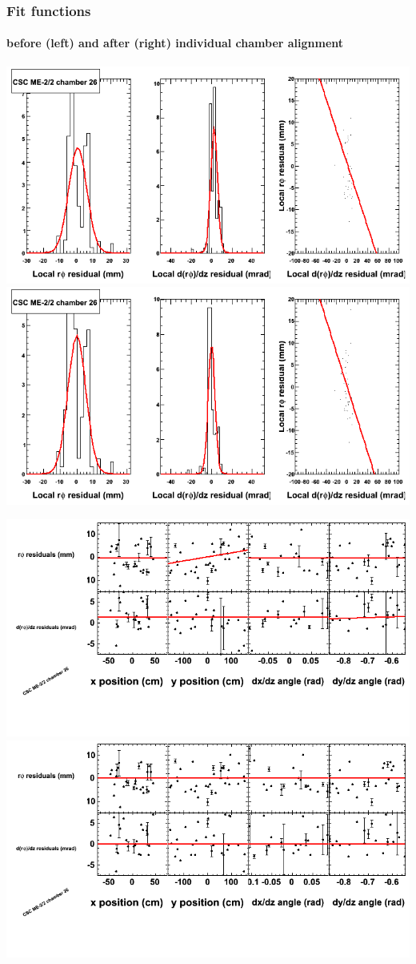 \documentclass[compress]{beamer}
\begin{document}
\begin{frame}
\frametitle{Fit functions}
\framesubtitle{before (left) and after (right) individual chamber alignment}
\includegraphics[width=0.5\linewidth]{ringfits_3dof/beforefit_MEm22_26_bellcurve.png} \includegraphics[width=0.5\linewidth]{ringfits_3dof/afterfit_MEm22_26_bellcurve.png}

\includegraphics[width=0.5\linewidth]{ringfits_3dof/beforefit_MEm22_26_polynomials.png} \includegraphics[width=0.5\linewidth]{ringfits_3dof/afterfit_MEm22_26_polynomials.png}
\end{frame}
\end{document}
